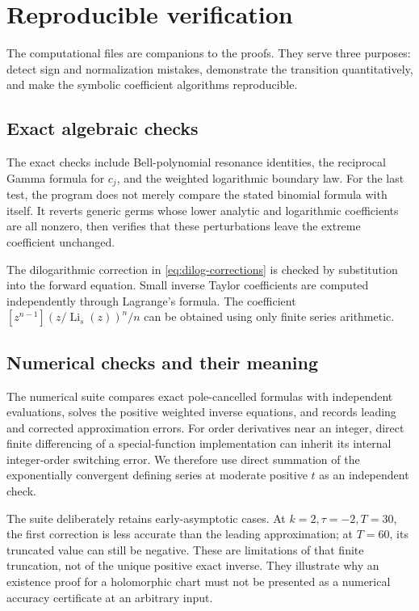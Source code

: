 \documentclass[11pt,a4paper]{article}
\numberwithin{equation}{section}
\theoremstyle{definition}
\theoremstyle{remark}
\DeclareMathOperator{\Li}{Li}
\begin{document}
\section{Reproducible verification}
\label{sec:verification}

The computational files are companions to the proofs.  They serve
three purposes: detect sign and normalization mistakes, demonstrate
the transition quantitatively, and make the symbolic coefficient
algorithms reproducible.

\subsection{Exact algebraic checks}

The exact checks include Bell-polynomial resonance identities, the
reciprocal Gamma formula for \(c_j\), and the weighted logarithmic
boundary law.  For the last test, the program does not merely compare
the stated binomial formula with itself.  It reverts generic germs
whose lower analytic and logarithmic coefficients are all nonzero,
then verifies that these perturbations leave the extreme coefficient
unchanged.

The dilogarithmic correction in \eqref{eq:dilog-corrections} is checked
by substitution into the forward equation.
Small inverse Taylor coefficients are computed independently through
Lagrange's formula.  The coefficient
\([z^{n-1}](z/\Li_s(z))^n/n\) can be obtained using only finite series
arithmetic.

\subsection{Numerical checks and their meaning}

The numerical suite compares exact pole-cancelled formulas with
independent evaluations, solves the positive weighted inverse
equations, and records leading and corrected approximation errors.
For order derivatives near an integer, direct finite differencing of
a special-function implementation can inherit its internal
integer-order switching error.  We therefore use direct summation of
the exponentially convergent defining series at moderate positive
\(t\) as an independent check.

The suite deliberately retains early-asymptotic cases.
At \(k=2,\tau=-2,T=30\), the first correction is less accurate than the
leading approximation; at \(T=60\), its truncated value can still be
negative.  These are limitations of that finite truncation, not of the
unique positive exact inverse.  They illustrate why an existence proof
for a holomorphic chart must not be presented as a numerical accuracy
certificate at an arbitrary input.
\end{document}
